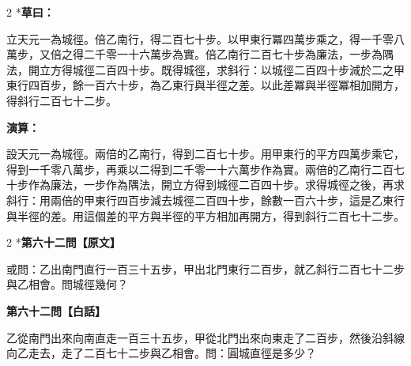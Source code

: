 \documentclass[11pt,a4paper]{article}
\begin{document}
\begin{paracol}{2}
\switchcolumn[0]*\textbf{草曰：}

\small 立天元一為城徑。倍乙南行，得二百七十步。以甲東行冪四萬步乘之，得一千零八萬步，又倍之得二千零一十六萬步為實。倍乙南行二百七十步為廉法，一步為隅法，開立方得城徑二百四十步。既得城徑，求斜行：以城徑二百四十步減於二之甲東行四百步，餘一百六十步，為乙東行與半徑之差。以此差冪與半徑冪相加開方，得斜行二百七十二步。

\switchcolumn\textbf{演算：}

\small 設天元一為城徑。兩倍的乙南行，得到二百七十步。用甲東行的平方四萬步乘它，得到一千零八萬步，再乘以二得到二千零一十六萬步作為實。兩倍的乙南行二百七十步作為廉法，一步作為隅法，開立方得到城徑二百四十步。求得城徑之後，再求斜行：用兩倍的甲東行四百步減去城徑二百四十步，餘數一百六十步，這是乙東行與半徑的差。用這個差的平方與半徑的平方相加再開方，得到斜行二百七十二步。
\end{paracol}

\vspace{0.1cm}
\noindent{}
\par\vspace{0.3cm}

\begin{paracol}{2}
\switchcolumn[0]*\noindent\textbf{第六十二問【原文】}

\small 或問：乙出南門直行一百三十五步，甲出北門東行二百步，就乙斜行二百七十二步與乙相會。問城徑幾何？

\switchcolumn\noindent\textbf{第六十二問【白話】}

\small 乙從南門出來向南直走一百三十五步，甲從北門出來向東走了二百步，然後沿斜線向乙走去，走了二百七十二步與乙相會。問：圓城直徑是多少？
\end{paracol}

\vspace{0.1cm}
\noindent{}
\par\vspace{0.15cm}
\end{document}
